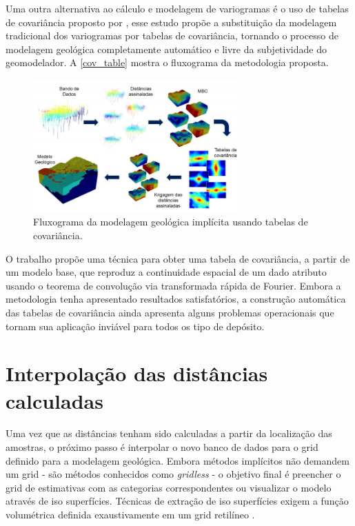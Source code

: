 Uma outra alternativa ao cálculo e modelagem de variogramas é o uso de tabelas de covariância proposto por , esse estudo propõe a substituição da modelagem tradicional dos variogramas por tabelas de covariância, tornando o processo de modelagem geológica completamente automático e livre da subjetividade do geomodelador. A \autoref{cov_table} mostra o fluxograma da metodologia proposta.

\begin{figure}[!htb]
	\caption{\label{cov_table}Fluxograma da modelagem geológica implícita usando tabelas de covariância.}
	\begin{center}
		\includegraphics[width=0.7\textwidth]{capitulo_2/cov_table.png}
	\end{center}
\end{figure}

O trabalho propõe uma técnica para obter uma tabela de covariância, a partir de um modelo base, que reproduz a continuidade espacial de um dado atributo usando o teorema de convolução via transformada rápida de Fourier. Embora a metodologia tenha apresentado resultados satisfatórios, a construção automática das tabelas de covariância ainda apresenta alguns problemas operacionais que tornam sua aplicação inviável para todos os tipo de depósito.

\section{Interpolação das distâncias calculadas}

Uma vez que as distâncias tenham sido calculadas a partir da localização das amostras, o próximo passo é interpolar o novo banco de dados para o grid definido para a modelagem geológica. Embora métodos implícitos não demandem um grid - são métodos conhecidos como \textit{gridless} - o objetivo final é preencher o grid de estimativas com as categorias correspondentes ou visualizar o modelo através de iso superfícies. Técnicas de extração de iso superfícies exigem a função volumétrica definida exaustivamente em um grid retilíneo  .

